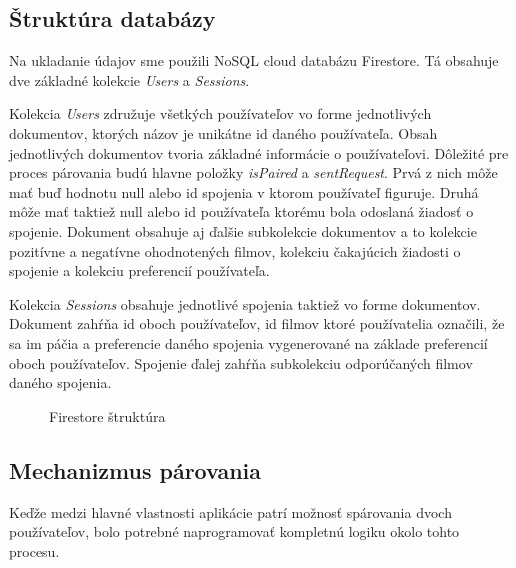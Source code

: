 \subsection{Štruktúra databázy}
Na ukladanie údajov sme použili NoSQL cloud databázu Firestore. Tá obsahuje dve základné kolekcie \textit{Users} a  \textit{Sessions}. 

Kolekcia \textit{Users} združuje všetkých používateľov vo forme jednotlivých dokumentov, ktorých názov je unikátne id daného používateľa. Obsah jednotlivých dokumentov tvoria základné informácie o používateľovi. Dôležité pre proces párovania budú hlavne položky \textit{isPaired} a \textit{sentRequest}. Prvá z nich môže mať buď hodnotu null alebo id spojenia v ktorom používateľ figuruje. Druhá môže mať taktiež null alebo id používateľa ktorému bola odoslaná žiadosť o spojenie. Dokument obsahuje aj ďalšie subkolekcie dokumentov a to kolekcie pozitívne a negatívne ohodnotených filmov, kolekciu čakajúcich žiadosti o spojenie a kolekciu preferencií používateľa.

Kolekcia \textit{Sessions} obsahuje jednotlivé spojenia taktiež vo forme dokumentov. Dokument zahŕňa id oboch používateľov, id filmov ktoré používatelia označili, že sa im páčia a preferencie daného spojenia vygenerované na základe preferencií oboch používateľov. Spojenie ďalej zahŕňa subkolekciu odporúčaných filmov daného spojenia. 
\vspace{55mm}

\begin{figure}[hbt!]
  \centering   
  \def\stackalignment{c}
           \scriptsize
	\caption{Firestore štruktúra}  
  \label{dbstructure}
\end{figure}

\subsection{Mechanizmus párovania}
Keďže medzi hlavné vlastnosti aplikácie patrí možnosť spárovania dvoch používateľov, bolo potrebné naprogramovať kompletnú logiku okolo tohto procesu. 

